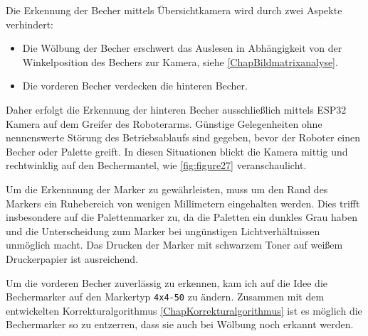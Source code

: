     Die Erkennung der Becher mittels Übersichtkamera wird durch zwei Aspekte verhindert:
    \begin{itemize}
        \item Die Wölbung der Becher erschwert das Auslesen in Abhängigkeit von der Winkelposition des Bechers zur Kamera, siehe \ref{ChapBildmatrixanalyse}.
        \item Die vorderen Becher verdecken die hinteren Becher.
    \end{itemize}

    Daher erfolgt die Erkennung der hinteren Becher ausschließlich mittels ESP32 Kamera auf dem Greifer des Roboterarms.
    Günstige Gelegenheiten ohne nennenswerte Störung des Betriebsablaufs sind gegeben, bevor der Roboter einen Becher oder Palette greift.
    In diesen Situationen blickt die Kamera mittig und rechtwinklig auf den Bechermantel, wie \ref{fig:figure27} veranschaulicht.

    Um die Erkennnung der Marker zu gewährleisten, muss um den Rand des Markers ein \glqq Ruhebereich \grqq von wenigen Millimetern eingehalten werden.
    Dies trifft insbesondere auf die Palettenmarker zu, da die Paletten ein dunkles Grau haben und die Unterscheidung zum Marker bei ungünstigen Lichtverhältnissen unmöglich macht.
    Das Drucken der Marker mit schwarzem Toner auf weißem Druckerpapier ist ausreichend.

    Um die vorderen Becher zuverlässig zu erkennen, kam ich auf die Idee die Bechermarker auf den Markertyp \verb|4x4-50| zu ändern.
    Zusammen mit dem entwickelten Korrekturalgorithmus \ref{ChapKorrekturalgorithmus} ist es möglich die Bechermarker so zu entzerren, dass sie auch bei Wölbung noch erkannt werden.

